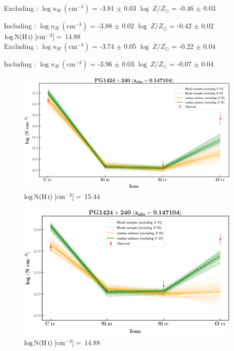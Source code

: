   Excluding  : $\log n_H \ (\text{cm}^{-3})$ = -3.81 $\pm$ 0.03 \hspace{10mm} $\log \ Z/Z_\odot$ = -0.46 $\pm$ 0.03
  
  Including  : $\log n_H \ (\text{cm}^{-3})$ = -3.88 $\pm$ 0.02 \hspace{10mm} $\log \ Z/Z_\odot$ = -0.42 $\pm$ 0.02 \\
  
  $\log \text{N}(\ion{H}{i}) \ [\text{cm}^{-2}]=$ 14.88 \\
  
  Excluding  : $\log n_H \ (\text{cm}^{-3})$ = -3.74 $\pm$ 0.05 \hspace{10mm} $\log \ Z/Z_\odot$ = -0.22 $\pm$ 0.04
  
  Including  : $\log n_H \ (\text{cm}^{-3})$ = -3.96 $\pm$ 0.03 \hspace{10mm} $\log \ Z/Z_\odot$ = -0.07 $\pm$ 0.04
  
  
  \begin{figure}[!h]
    \centering
      \includegraphics[width=0.85\linewidth]{Ionisation-Modelling-Plots/pg1424-z=0.147104-compIII.png}
      \caption{$\log \text{N}(\ion{H}{i}) \ [\text{cm}^{-2}]=$ 15.44}
  \end{figure}
  
  \begin{figure}[!b]
    \centering
      \includegraphics[width=0.85\linewidth]{Ionisation-Modelling-Plots/pg1424-z=0.147104-compII.png}
      \caption{$\log \text{N}(\ion{H}{i}) \ [\text{cm}^{-2}]=$ 14.88}
  \end{figure}
  
